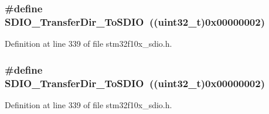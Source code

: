 \subsubsection[{\texorpdfstring{S\+D\+I\+O\+\_\+\+Transfer\+Dir\+\_\+\+To\+S\+D\+IO}{SDIO_TransferDir_ToSDIO}}]{\setlength{\rightskip}{0pt plus 5cm}\#define S\+D\+I\+O\+\_\+\+Transfer\+Dir\+\_\+\+To\+S\+D\+IO~(({\bf uint32\+\_\+t})0x00000002)}\hypertarget{group___s_d_i_o___transfer___direction_ga55a6d9613d3e2e7762296b45d0d13222}{}\label{group___s_d_i_o___transfer___direction_ga55a6d9613d3e2e7762296b45d0d13222}


Definition at line 339 of file stm32f10x\+\_\+sdio.\+h.

\subsubsection[{\texorpdfstring{S\+D\+I\+O\+\_\+\+Transfer\+Dir\+\_\+\+To\+S\+D\+IO}{SDIO_TransferDir_ToSDIO}}]{\setlength{\rightskip}{0pt plus 5cm}\#define S\+D\+I\+O\+\_\+\+Transfer\+Dir\+\_\+\+To\+S\+D\+IO~(({\bf uint32\+\_\+t})0x00000002)}\hypertarget{group___s_d_i_o___transfer___direction_ga55a6d9613d3e2e7762296b45d0d13222}{}\label{group___s_d_i_o___transfer___direction_ga55a6d9613d3e2e7762296b45d0d13222}


Definition at line 339 of file stm32f10x\+\_\+sdio.\+h.

